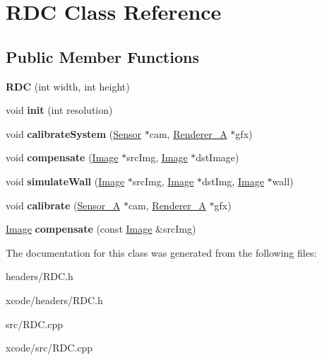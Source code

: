 \hypertarget{class_r_d_c}{\section{R\-D\-C Class Reference}
\label{class_r_d_c}
}
\subsection*{Public Member Functions}
\begin{DoxyCompactItemize}
\item 
\hypertarget{class_r_d_c_a2f266b7215ade29eb5f4ecd3882ee475}{{\bfseries R\-D\-C} (int width, int height)}\label{class_r_d_c_a2f266b7215ade29eb5f4ecd3882ee475}

\item 
\hypertarget{class_r_d_c_a4cce740ee5b8b5a56dad854acdf2ba9b}{void {\bfseries init} (int resolution)}\label{class_r_d_c_a4cce740ee5b8b5a56dad854acdf2ba9b}

\item 
\hypertarget{class_r_d_c_a520a27505dafa3ded833045ca748207c}{void {\bfseries calibrate\-System} (\hyperlink{class_sensor}{Sensor} $\ast$cam, \hyperlink{class_renderer___a}{Renderer\-\_\-\-A} $\ast$gfx)}\label{class_r_d_c_a520a27505dafa3ded833045ca748207c}

\item 
\hypertarget{class_r_d_c_a6345820b0dc9fd9c63440eb7f69ec4c9}{void {\bfseries compensate} (\hyperlink{class_image}{Image} $\ast$src\-Img, \hyperlink{class_image}{Image} $\ast$dst\-Image)}\label{class_r_d_c_a6345820b0dc9fd9c63440eb7f69ec4c9}

\item 
\hypertarget{class_r_d_c_abaa34773cddd4c9d59f6beefed42289a}{void {\bfseries simulate\-Wall} (\hyperlink{class_image}{Image} $\ast$src\-Img, \hyperlink{class_image}{Image} $\ast$dst\-Img, \hyperlink{class_image}{Image} $\ast$wall)}\label{class_r_d_c_abaa34773cddd4c9d59f6beefed42289a}

\item 
\hypertarget{class_r_d_c_a70face7e6f7c3f65772614fca001a52e}{void {\bfseries calibrate} (\hyperlink{class_sensor___a}{Sensor\-\_\-\-A} $\ast$cam, \hyperlink{class_renderer___a}{Renderer\-\_\-\-A} $\ast$gfx)}\label{class_r_d_c_a70face7e6f7c3f65772614fca001a52e}

\item 
\hypertarget{class_r_d_c_afd4c8763d879d5c811ed1329d1ab12a2}{\hyperlink{class_image}{Image} {\bfseries compensate} (const \hyperlink{class_image}{Image} \&src\-Img)}\label{class_r_d_c_afd4c8763d879d5c811ed1329d1ab12a2}

\end{DoxyCompactItemize}


The documentation for this class was generated from the following files\-:\begin{DoxyCompactItemize}
\item 
headers/R\-D\-C.\-h\item 
xcode/headers/R\-D\-C.\-h\item 
src/R\-D\-C.\-cpp\item 
xcode/src/R\-D\-C.\-cpp\end{DoxyCompactItemize}
